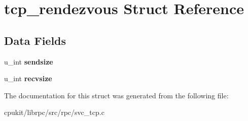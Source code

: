 \hypertarget{structtcp__rendezvous}{}\section{tcp\+\_\+rendezvous Struct Reference}
\label{structtcp__rendezvous}
\subsection*{Data Fields}
\begin{DoxyCompactItemize}
\item 
\mbox{\label{structtcp__rendezvous_af2ccc557211694e9e78eeda379e1c948}} 
u\+\_\+int {\bfseries sendsize}
\item 
\mbox{\label{structtcp__rendezvous_ae0f2f72f17ef77d1262405722f115126}} 
u\+\_\+int {\bfseries recvsize}
\end{DoxyCompactItemize}


The documentation for this struct was generated from the following file\+:\begin{DoxyCompactItemize}
\item 
cpukit/librpc/src/rpc/svc\+\_\+tcp.\+c\end{DoxyCompactItemize}
